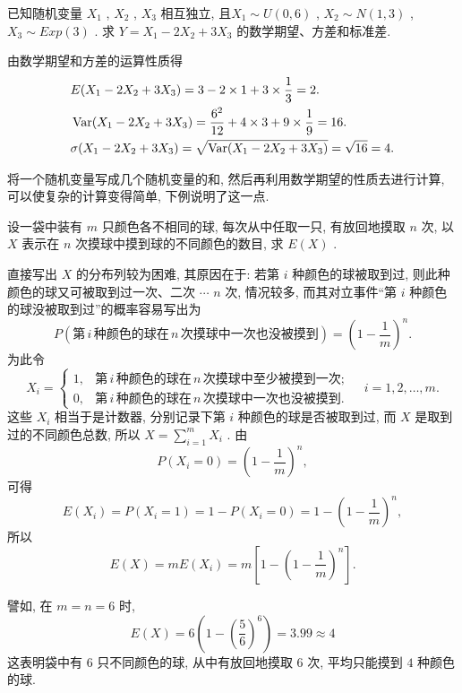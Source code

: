   \begin{example}\label{exam:3.4.3}
  	已知随机变量 $X_1$ , $X_2$ , $X_3$ 相互独立, 且$X_1 \sim U(0,6)$ , $X_2 \sim N(1,3)$ , $X_3 \sim Exp(3)$ . 求 $Y=X_1-2X_2+3X_3$ 的数学期望、方差和标准差.
  	\begin{solution}
  		由数学期望和方差的运算性质得
  		\begin{align*}
  			&E(X_1-2X_2+3X_3)=3 - 2\times1 + 3\times\frac{1}{3}=2.\\
  			&\operatorname{Var}(X_1-2X_2+3X_3)=\frac{6^2}{12}+4\times3+9\times\frac{1}{9}=16.\\
  			&\sigma(X_1-2X_2+3X_3)=\sqrt{\operatorname{Var}(X_1-2X_2+3X_3)}=\sqrt{16}=4.
  		\end{align*}
  	\end{solution}
  \end{example}
  将一个随机变量写成几个随机变量的和, 然后再利用数学期望的性质去进行计算, 可以使复杂的计算变得简单, 下例说明了这一点.
  \begin{example}\label{exam:3.4.4}
  	设一袋中装有 $m$ 只颜色各不相同的球, 每次从中任取一只, 有放回地摸取 $n$ 次, 以 $X$ 表示在 $n$ 次摸球中摸到球的不同颜色的数目, 求 $E(X)$ .
  	\begin{solution}
  		直接写出 $X$ 的分布列较为困难, 其原因在于: 若第 $i$ 种颜色的球被取到过, 则此种颜色的球又可被取到过一次、二次 $\cdots$ $n$ 次, 情况较多, 而其对立事件“第 $i$ 种颜色的球没被取到过”的概率容易写出为
  		\begin{equation*}
  			P(\text{第}\,i\,\text{种颜色的球在}\,n\,\text{次摸球中一次也没被摸到})=\left( 1-\frac{1}{m} \right)^n.
  		\end{equation*}
  		为此令
  		\begin{equation*}
  			X_i=
  			\begin{cases}
  			1, & \text{第}\,i\,\text{种颜色的球在}\,n\,\text{次摸球中至少被摸到一次};\\
  			0, & \text{第}\,i\,\text{种颜色的球在}\,n\,\text{次摸球中一次也没被摸到}.
  			\end{cases}\quad
  			i=1,2,\ldots,m.
  		\end{equation*}
  		这些 $X_i$ 相当于是计数器, 分别记录下第 $i$ 种颜色的球是否被取到过, 而 $X$ 是取到过的不同颜色总数, 所以 $X=\sum_{i=1}^{m}X_i$ . 由
  		\begin{equation*}
  			P\left(X_{i}=0\right)=\left(1-\frac{1}{m}\right)^{n},
  		\end{equation*}
  		可得
  		\begin{equation*}
  			E\left(X_{i}\right)=P\left(X_{i}=1\right)=1-P\left(X_{i}=0\right)=1-\left(1-\frac{1}{m}\right)^{n},
  		\end{equation*}
  		所以
  		\begin{equation*}
  			E(X)=m E\left(X_{i}\right)=m\left[1-\left(1-\frac{1}{m}\right)^{n}\right].
  		\end{equation*}
  	\end{solution}
  譬如, 在 $m=n=6$ 时,
  \begin{equation*}
  	E(X)=6\left(1-\left(\frac{5}{6}\right)^{6}\right)=3.99 \approx 4
  \end{equation*}
  这表明袋中有 $6$ 只不同颜色的球, 从中有放回地摸取 $6$ 次, 平均只能摸到 $4$ 种颜色的球.
  \end{example}
